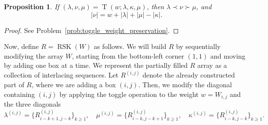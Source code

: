 \documentclass[letterpaper,11pt,oneside,reqno]{article}
\numberwithin{equation}{section}
\newtheorem{proposition}{Proposition}[section]
\theoremstyle{definition}
\begin{document}
\begin{proposition}
	\label{prop:toggle_weight_preservation}
	If $(\lambda,\nu,\mu)=\operatorname{T}(w;\lambda,\kappa,\mu)$, then
	$\lambda\prec\nu\succ \mu$, and
	\begin{equation*}
		|\nu|=w+|\lambda|+|\mu|-|\kappa|.
	\end{equation*}
\end{proposition}
\begin{proof}
	See Problem~\ref{prob:toggle_weight_preservation}.
\end{proof}


Now, define $R=\operatorname{RSK}(W)$ as follows.
We will build $R$
by sequentially modifying the array $W$,
starting from the bottom-left corner $(1,1)$ and moving
by adding one box at a time.
We represent the partially filled $R$ array as a collection of interlacing sequences.
Let $R^{(i,j)}$ denote the already constructed part of $R$, where we are adding a
box $(i,j)$. Then, we modify the diagonal containing
$(i,j)$ by applying the toggle operation to the weight $w=W_{i,j}$ and the three diagonals
\begin{equation*}
	\lambda^{(i,j)} = \{R^{(i,j)}_{i-k+1,j-k}\}_{k\ge1}, \quad
	\mu^{(i,j)} = \{R^{(i,j)}_{i-k,j-k+1}\}_{k\ge1}, \quad
	\kappa^{(i,j)} = \{R^{(i,j)}_{i-k,j-k}\}_{k\ge1}.
\end{equation*}
\end{document}
